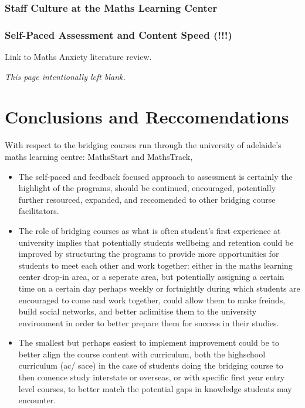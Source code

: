 \documentclass[twoside,12pt,a4paper]{report}
\makeatletter
\newcommand*{\intentionallyblankpage}{
  \vspace*{\fill}
  {\centering \textit{This page intentionally left blank.} \par}
  \vspace{\fill}}
\renewcommand*{\cleardoublepage}{\clearpage\if@twoside \ifodd\c@page\else
  \intentionallyblankpage
  \newpage
  \if@twocolumn\hbox{}\newpage\fi\fi\fi}
\makeatother
\begin{document}
\subsection{Staff Culture at the Maths Learning Center}

\subsection{Self-Paced Assessment and Content Speed (!!!)}

Link to Maths Anxiety literature review.



\cleardoublepage
\chapter*{Conclusions and Reccomendations}

With respect to the bridging courses run through the university of adelaide's maths learning centre: MathsStart and MathsTrack,
\begin{itemize}
	\item The self-paced and feedback focused approach to assessment is certainly the highlight of the programs, should be continued, encouraged, potentially further resourced, expanded, and reccomended to other bridging course facilitators.
	\item The role of bridging courses as what is often student's first experience at university implies that potentially students wellbeing and retention could be improved by structuring the programs to provide more opportunities for students to meet each other and work together: either in the maths learning center drop-in area, or a seperate area, but potentially assigning a certain time on a certain day perhaps weekly or fortnightly during which students are encouraged to come and work together, could allow them to make freinds, build social networks, and better aclimitise them to the university environment in order to better prepare them for success in their studies.
	\item The smallest but perhaps easiest to implement improvement could be to better align the course content with curriculum, both the highschool curriculum (\gls{ac}/ \gls{sace}) in the case of students doing the bridging course to then comence study interstate or overseas, or with specific first year entry level courses, to better match the potential gaps in knowledge students may encounter.
\end{itemize}

\glsresetall

 
\end{document}
